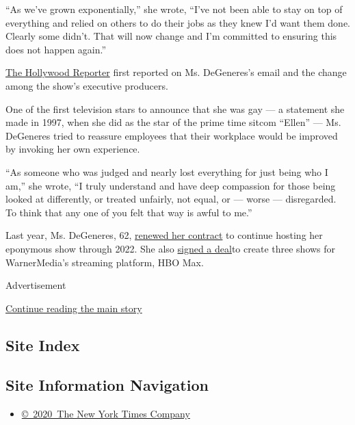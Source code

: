 ``As we've grown exponentially,'' she wrote, ``I've not been able to
stay on top of everything and relied on others to do their jobs as they
knew I'd want them done. Clearly some didn't. That will now change and
I'm committed to ensuring this does not happen again.''

\href{https://www.hollywoodreporter.com/live-feed/ellen-degeneres-addresses-workplace-allegations-changes-forthcoming-staff-letter-1305189?utm_source=Sailthru\&utm_medium=email\&utm_campaign=THR\%20Breaking\%20News_now_2020-07-30\%2014:15:33_lperez\&utm_term=hollywoodreporter_breakingnews}{The
Hollywood Reporter} first reported on Ms. DeGeneres's email and the
change among the show's executive producers.

One of the first television stars to announce that she was gay --- a
statement she made in 1997, when she did as the star of the prime time
sitcom ``Ellen'' --- Ms. DeGeneres tried to reassure employees that
their workplace would be improved by invoking her own experience.

``As someone who was judged and nearly lost everything for just being
who I am,'' she wrote, ``I truly understand and have deep compassion for
those being looked at differently, or treated unfairly, not equal, or
--- worse --- disregarded. To think that any one of you felt that way is
awful to me.''

Last year, Ms. DeGeneres, 62,
\href{https://www.nytimes3xbfgragh.onion/2018/12/12/arts/television/ellen-degeneres.html}{renewed
her contract} to continue hosting her eponymous show through 2022. She
also
\href{https://www.nytimes3xbfgragh.onion/2019/09/27/business/ellen-degeneres-hbo-max.html}{signed
a deal}to create three shows for WarnerMedia's streaming platform, HBO
Max.

Advertisement

\protect\hyperlink{after-bottom}{Continue reading the main story}

\hypertarget{site-index}{%
\subsection{Site Index}\label{site-index}}

\hypertarget{site-information-navigation}{%
\subsection{Site Information
Navigation}\label{site-information-navigation}}

\begin{itemize}
\tightlist
\item
  \href{https://help.nytimes3xbfgragh.onion/hc/en-us/articles/115014792127-Copyright-notice}{©~2020~The
  New York Times Company}
\end{itemize}

